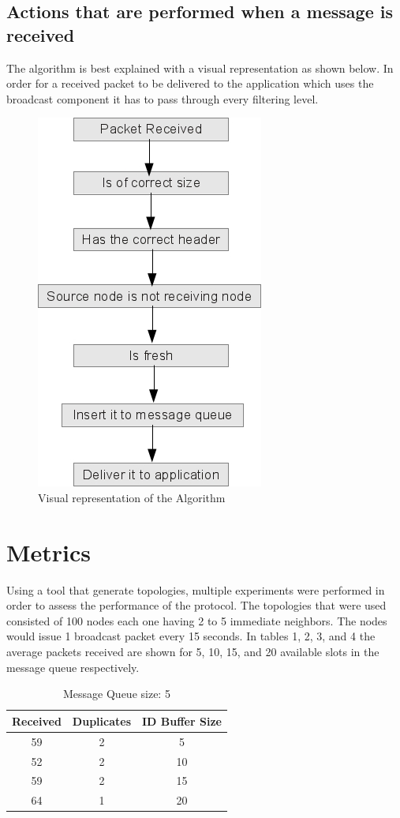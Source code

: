\documentclass[a4paper]{article}
\begin{document}
\newpage

\subsection{Actions that are performed when a message is received}

The algorithm is best explained with a visual representation as shown below. In order for a received packet
to be delivered to the application which uses the broadcast component it has to pass through every
filtering level.

\begin{figure}[h]
\centering
\includegraphics[width=0.4\linewidth]{algorithm.jpg}
\caption{Visual representation of the Algorithm}
\end{figure}

\section{Metrics}

Using a tool that generate topologies, multiple experiments were performed in order to assess the performance
of the protocol. The topologies that were used consisted of 100 nodes each one having 2 to 5 immediate neighbors.
The nodes would issue 1 broadcast packet every 15 seconds. In tables 1, 2, 3, and 4 the
average packets received are shown for 5, 10, 15, and 20 available slots in the message queue respectively.

\begin{table}[H]
\centering
\begin{tabular}{|c|c|c|}
\hline
Received&	Duplicates& 	ID Buffer Size \\
\hline
59&	2	&	5 \\
\hline
52&	2	&	10 \\
\hline
59 &	2	&	15 \\
\hline
64&	1&	20 \\
\hline
\end{tabular}
\label{f1}
\caption{Message Queue size: 5}
\end{table}
\end{document}
